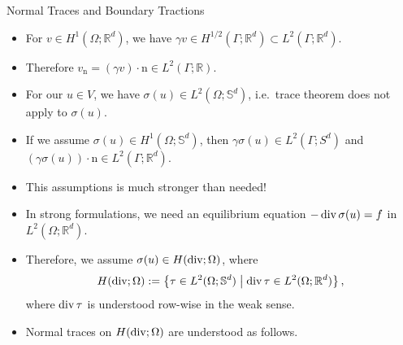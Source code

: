 \documentclass[10pt,aspectratio=169]{beamer}
\def\R{{\mathbb R}}
\def\S{{\mathbb S}}
\newcommand{\diver}{\operatornamewithlimits{div}}
\begin{document}
\begin{frame}{Normal Traces and Boundary Tractions}
	\begin{itemize}
		\item For $v\in H^1(\Omega;\R^d)$, we have $\gamma v\in H^{1/2}(\Gamma;\R^d)\subset L^2(\Gamma;\R^d)$.
		\item Therefore $v_\mathrm{n} = (\gamma v)\cdot \mathrm{n} \in L^2(\Gamma;\R)$.
		\item For our $u\in V$, we have $\sigma(u)\in L^2(\Omega;\S^d)$, i.e.\ trace theorem does not apply to $\sigma(u)$.
		\item If we assume $\sigma(u)\in H^1(\Omega;\S^d)$, then $\gamma\sigma(u)\in L^2(\Gamma;S^d)$ and $(\gamma\sigma(u))\cdot\mathrm{n}\in L^2(\Gamma;\R^d)$.
		\item This assumptions is much stronger than needed!
		\item In strong formulations, we need an equilibrium equation $-\diver \sigma(u) = f$ in $L^2(\Omega;\R^d)$.
		\item Therefore, we assume $\sigma(u)\in H(\diver;\Omega)$, where
		      \begin{equation*}
			      H(\diver;\Omega):= \left\{\tau\in L^2(\Omega;\S^d)\;\middle|\;\diver\tau\in L^2(\Omega;\R^d)\right\},
		      \end{equation*}
		      where $\diver \tau$ is understood row-wise in the weak sense.
		\item Normal traces on $H(\diver;\Omega)$ are understood as follows.
	\end{itemize}
\end{frame}
\end{document}

